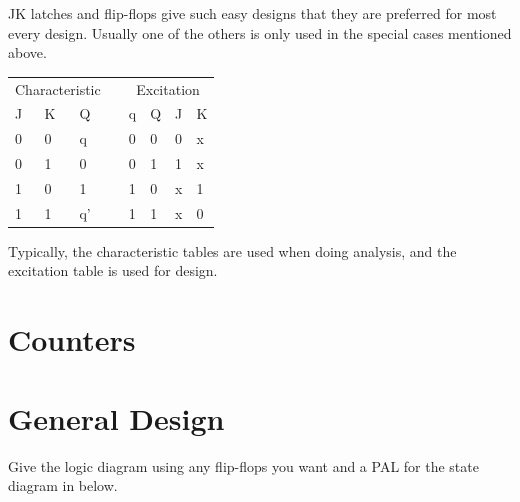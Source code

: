 JK latches and flip-flops give such easy designs that they are preferred for most every design.  Usually one of the others is only used in the special cases mentioned above.

\noindent
\begin{tabular}{ll||lp{.25in}ll||ll}
\multicolumn{3}{c}{Characteristic} && \multicolumn{4}{c}{Excitation} \\
J & K & Q  && q & Q & J & K \\ \cline{1-3} \cline{5-8}
0 & 0 & q  && 0 & 0 & 0 & x \\
0 & 1 & 0  && 0 & 1 & 1 & x \\
1 & 0 & 1  && 1 & 0 & x & 1 \\
1 & 1 & q' && 1 & 1 & x & 0 \\
\end{tabular}

Typically, the characteristic tables are used when doing analysis, and the excitation table is used for design.

\onecolumn

\section{Counters}



\section{General Design}


Give the logic diagram using any flip-flops you want and a PAL for the state diagram in below.

